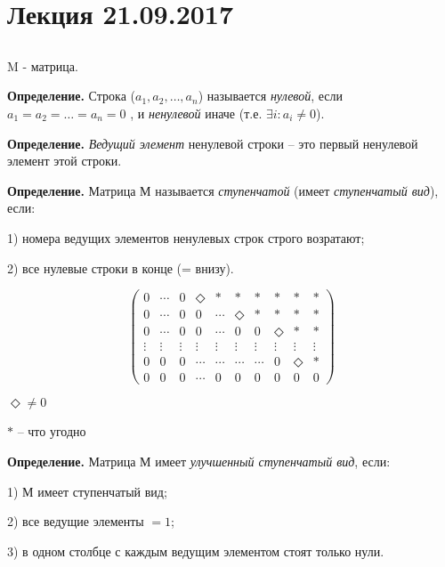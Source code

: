 \section{Лекция 21.09.2017}

\subsection{}
M - матрица.

\bigskip
\textbf{Определение.} Строка ($a_1, a_2, \dots , a_n$) называется \textit{нулевой}, если $a_1 = a_2 = \dots = a_n = 0$ , и \textit{ненулевой} иначе (т.е. $\exists i: a_i \neq 0$).

\bigskip
\textbf{Определение.} \textit{Ведущий элемент} ненулевой строки -- это первый ненулевой элемент этой строки.

\bigskip
\textbf{Определение.} Матрица М называется \textit{ступенчатой} (имеет \textit{ступенчатый вид}), если:

1) номера ведущих элементов ненулевых строк строго возратают;

2) все нулевые строки в конце (= внизу).

\begin{equation*}
    \begin{pmatrix}
    	0 & \cdots & 0 & \Diamond & * & * & * & * & * & * \\
        0 & \cdots & 0 & 0 & \cdots & \Diamond & * & * & * & * \\
        0 & \cdots & 0 & 0 & \cdots & 0 & 0 & \Diamond & * & * \\
        \vdots & \vdots & \vdots& \vdots & \vdots & \vdots & \vdots & \vdots & \vdots& \vdots \\
        0 & 0 & 0 & \cdots & \cdots & \cdots & \cdots & 0 & \Diamond & *\\
        0 & 0 & 0 & \cdots & 0 & 0 & 0 & 0 & 0 & 0
	\end{pmatrix}
\end{equation*}

$\Diamond \neq 0$

$*$ -- что угодно

\bigskip
\textbf{Определение.} Матрица М имеет \textit{улучшенный ступенчатый вид}, если:

1) М имеет ступенчатый вид;

2) все ведущие элементы $ = 1$;

3) в одном столбце с каждым ведущим элементом стоят только нули.

